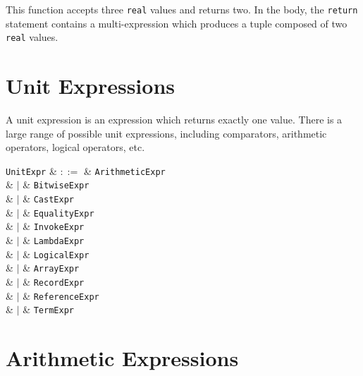 

This function accepts three \lstinline{real} values and returns two.  In the body, the \lstinline{return} statement contains a multi-expression which produces a tuple composed of two \lstinline{real} values.


\section{Unit Expressions}
\label{c_expr_unit}

A unit expression is an expression which returns exactly one value.  There is a large range of possible unit expressions, including comparators, arithmetic operators, logical operators, etc.

\begin{syntax}
  \verb+UnitExpr+ & $::=$ & \verb+ArithmeticExpr+\\
                  &  $|$  & \verb+BitwiseExpr+\\
                  &  $|$  & \verb+CastExpr+\\
                  &  $|$  & \verb+EqualityExpr+\\
                  &  $|$  & \verb+InvokeExpr+\\
                  &  $|$  & \verb+LambdaExpr+\\
                  &  $|$  & \verb+LogicalExpr+\\
                  &  $|$  & \verb+ArrayExpr+\\
                  &  $|$  & \verb+RecordExpr+\\
                  &  $|$  & \verb+ReferenceExpr+\\
                  &  $|$  & \verb+TermExpr+\\
                
\end{syntax}


\section{Arithmetic Expressions}
\label{c_expr_arithmetic}

